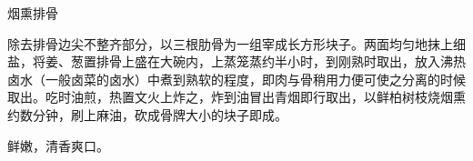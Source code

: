 \begin{recipe}{烟熏排骨}

\ingredients




\cooking

除去排骨边尖不整齐部分，以三根肋骨为一组宰成长方形块子。两面均匀地抹上细盐，将姜、葱置排骨上盛在大碗内，上蒸笼蒸约半小时，到刚熟时取出，放入沸热卤水（一般卤菜的卤水）中煮到熟软的程度，即肉与骨稍用力便可使之分离的时候取出。吃时油煎，热置文火上炸之，炸到油冒出青烟即行取出，以鲜柏树枝烧烟熏约数分钟，刷上麻油，砍成骨牌大小的块子即成。

\notes

鲜嫩，清香爽口。

\end{recipe}

